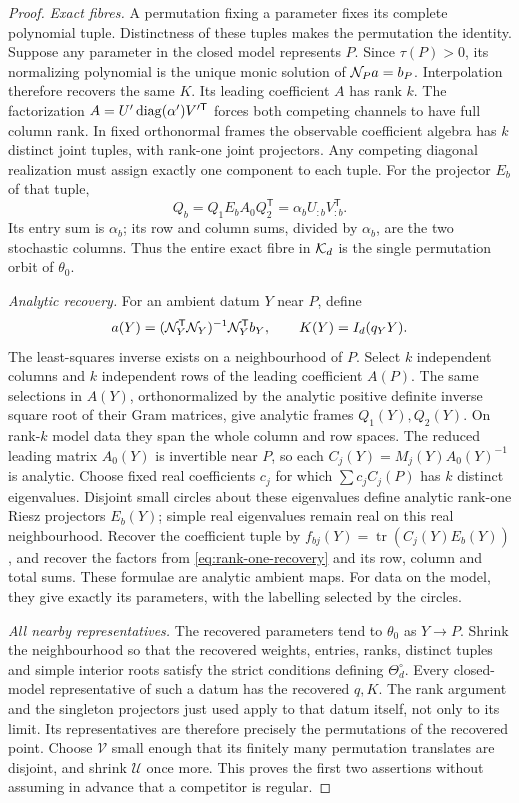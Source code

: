 \begin{proof}
\emph{Exact fibres.} A permutation fixing a parameter fixes its complete
polynomial tuple. Distinctness of these tuples makes the permutation
the identity. Suppose any parameter in the closed model represents $P$.
Since $\tau(P)>0$, its normalizing polynomial is the unique monic
solution of $\mathcal N_Pa=b_P$. Interpolation therefore recovers the same
$K$. Its leading coefficient $A$ has rank $k$. The factorization
$A=U'\operatorname{diag}(\alpha')V'^{\mathsf T}$ forces both competing channels to
have full column rank. In fixed orthonormal frames the observable
coefficient algebra has $k$ distinct joint tuples, with rank-one joint
projectors. Any competing diagonal realization must assign exactly one
component to each tuple. For the projector $E_b$ of that tuple,
\begin{equation}\label{eq:rank-one-recovery}
 Q_b=Q_1E_bA_0Q_2^{\mathsf T}
       =\alpha_bU_{:b}V_{:b}^{\mathsf T}.
\end{equation}
Its entry sum is $\alpha_b$; its row and column sums, divided by
$\alpha_b$, are the two stochastic columns. Thus the entire exact fibre
in $\mathcal K_d$ is the single permutation orbit of $\theta_0$.

\emph{Analytic recovery.} For an ambient datum $Y$ near $P$, define
\[
 a(Y)=(\mathcal N_Y^{\mathsf T}\mathcal N_Y)^{-1}\mathcal N_Y^{\mathsf T}b_Y,
 \qquad K(Y)=I_d(q_Y Y).
\]
The least-squares inverse exists on a neighbourhood of $P$. Select $k$
independent columns and $k$ independent rows of the leading coefficient
$A(P)$. The same selections in $A(Y)$, orthonormalized by the analytic
positive definite inverse square root of their Gram matrices, give
analytic frames $Q_1(Y),Q_2(Y)$. On rank-$k$ model data they span the
whole column and row spaces. The reduced leading matrix $A_0(Y)$ is
invertible near $P$, so each $C_j(Y)=M_j(Y)A_0(Y)^{-1}$ is analytic.
Choose fixed real coefficients $c_j$ for which $\sum c_j C_j(P)$ has
$k$ distinct eigenvalues. Disjoint small circles about these eigenvalues
define analytic rank-one Riesz projectors $E_b(Y)$; simple real
eigenvalues remain real on this real neighbourhood. Recover the
coefficient tuple by $f_{bj}(Y)=\operatorname{tr}(C_j(Y)E_b(Y))$, and
recover the factors from \eqref{eq:rank-one-recovery} and its row,
column and total sums. These formulae are analytic ambient maps.
For data on the model, they give exactly its parameters, with the
labelling selected by the circles.

\emph{All nearby representatives.} The recovered parameters tend to
$\theta_0$ as $Y\to P$. Shrink the neighbourhood so that the recovered
weights, entries, ranks, distinct tuples and simple interior roots
satisfy the strict conditions defining $\Theta^\circ_d$. Every
closed-model representative of such a datum has the recovered $q,K$.
The rank argument and the singleton projectors just used apply to that
datum itself, not only to its limit. Its representatives are therefore
precisely the permutations of the recovered point. Choose $\mathcal V$
small enough that its finitely many permutation translates are disjoint,
and shrink $\mathcal U$ once more. This proves the first two assertions
without assuming in advance that a competitor is regular.


\end{proof}
